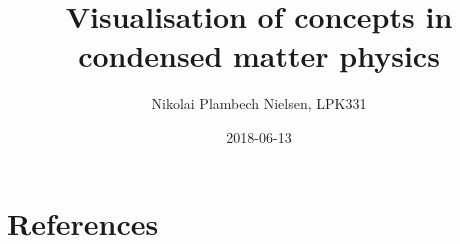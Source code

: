 \documentclass[a4paper,11pt]{article}
\title{Visualisation of concepts in condensed matter physics}
\author{Nikolai Plambech Nielsen, LPK331}
\date{2018-06-13}
\numberwithin{equation}{section}
\begin{document}
	
	\maketitle
	
	\tableofcontents
	
	\newpage
	
	
	
	
	
	
	
	
	\section{References}
	
	
	
\end{document}
